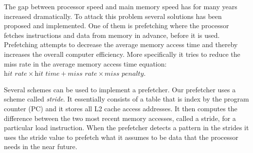 The gap between processor speed and main memory speed has for many years increased
dramatically\cite{mem_cpu_gap}. To attack this problem several solutions has been proposed and
implemented. One of them is prefetching where the processor fetches instructions and data from
memory in advance, before it is used.  Prefetching attempts to decrease the average memory access
time and thereby increases the overall computer efficiency. More specifically it tries to reduce the
miss rate in the average memory access time equation: $ \textit{hit rate} \times \textit{hit time} +
\textit{miss rate} \times \textit{miss penalty} $.

Several schemes can be used to implement a prefetcher. Our prefetcher uses a scheme called
\emph{stride}. It essentially consists of a table that is index by the program counter (PC) and it
stores all L2 cache access addresses. It then computes the difference between the
two most recent memory accesses, called a stride, for a particular load instruction. When the
prefetcher detects a pattern in the strides it uses the stride value to prefetch what it assumes to
be data that the processor needs in the near future.


